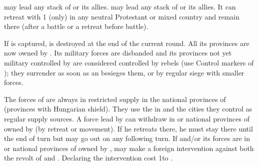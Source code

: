 \phmil
\aparag \leaderTilly may lead any stack of \paysBaviere or its allies.
\aparag \leaderMansfeld may lead any stack of \paysPalatinat or its allies. It
can retreat with 1 \LD (only) in any neutral Protestant or mixed \HRE country
and remain there (after a battle or a retreat before battle).

\label{pIV:BR:Destruction}
If \villePrague is captured, \paysBoheme is destroyed at the end of the
current round. All its provinces are now owned by \HAB.  Its military forces
are disbanded and its provinces not yet military controlled by \HAB are
considered controlled by rebels (use Control markers of \paysBoheme); they
surrender as soon as an \ARMY \faceplus besieges them, or by regular siege
with smaller forces.

\aparag[Bethlén]
\bparag The forces of \leaderBethlen are always in restricted supply in the
national provinces of \paysHongrie (provinces with Hungarian shield). They use
the \REVOLT in \paysHongrie and the cities they control as regular supply
sources.
\bparag A force lead by \leaderBethlen can withdraw in \paysTransylvanie or
national provinces of \payshongrie owned by \TUR (by retreat or movement). If
he retreats there, he must stay there until the end of turn but may go out on
any following turn.
\bparag If \leaderBethlen and/or its forces are in \paysTransylvanie
or national provinces of \payshongrie owned by \TUR, \TUR may make a foreign
intervention against both the revolt of \leaderBethlen and \HAB. Declaring the
intervention cost 1\STAB to \TUR.

